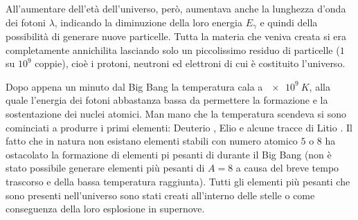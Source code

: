 All'aumentare dell'età dell'universo, però, aumentava anche la lunghezza d'onda dei fotoni $\lambda$, indicando la diminuzione della loro energia $E_\gamma$ e quindi della possibilità di generare nuove particelle. Tutta la materia che veniva creata si era completamente annichilita lasciando solo un piccolissimo residuo di particelle ($1$ su $10^9$ coppie), cioè i protoni, neutroni ed elettroni di cui è costituito l'universo. 

Dopo appena un minuto dal Big Bang la temperatura cala a $\SI{e9}{K}$, alla quale l'energia dei fotoni abbastanza bassa da permettere la formazione e la sostentazione dei nuclei atomici. Man mano che la temperatura scendeva si sono cominciati a produrre i primi elementi: Deuterio , Elio  e alcune tracce di Litio . Il fatto che in natura non esistano elementi stabili con numero atomico $5$ o $8$ ha ostacolato la formazione di elementi pi pesanti di  durante il Big Bang (non è stato possibile generare elementi più pesanti di $A=8$ a causa del breve tempo trascorso e della bassa temperatura raggiunta). Tutti gli elementi più pesanti che sono presenti nell'universo sono stati creati all'interno delle stelle o come conseguenza della loro esplosione in supernove.

